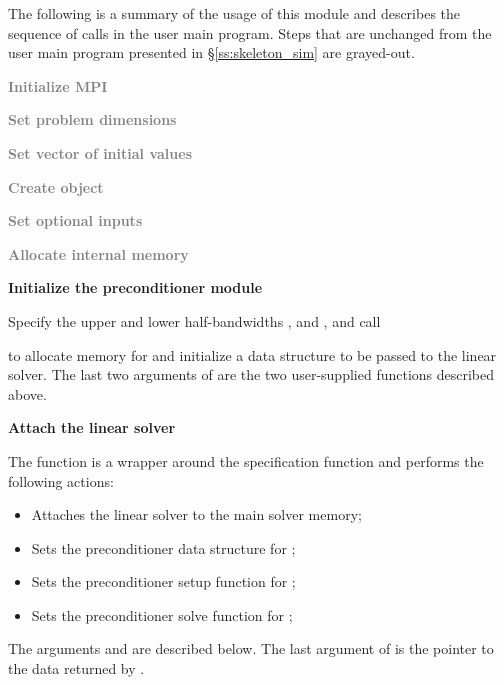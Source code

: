 The following is a summary of the usage of this module and describes the sequence
of calls in the user main program. Steps that are unchanged from the user main
program presented in \S\ref{ss:skeleton_sim} are grayed-out.
\begin{Steps}
\item 
  \textcolor{gray}{\bf Initialize MPI}

\item
  \textcolor{gray}{\bf Set problem dimensions}

\item
  \textcolor{gray}{\bf Set vector of initial values}
 
\item
  \textcolor{gray}{\bf Create {\cvode} object}

\item
  \textcolor{gray}{\bf Set optional inputs}

\item
  \textcolor{gray}{\bf Allocate internal memory}

\item \label{i:bbdpre_init}
  {\bf Initialize the {\cvbbdpre} preconditioner module}

  Specify the upper and lower half-bandwidths ,  and
  ,  and call 


  to allocate memory for and initialize a data structure  to be 
  passed to the {\cvspgmr} linear solver. The last two arguments of
   are the two user-supplied functions described above.

\item \label{i:bbdpre_attach}
  {\bf Attach the {\cvspgmr} linear solver}


  The function  is a wrapper around the {\cvspgmr} specification
  function  and performs the following actions:
  \begin{itemize}
    \item Attaches the {\cvspgmr} linear solver to the main {\cvode} solver memory;
    \item Sets the preconditioner data structure for {\cvbbdpre};
    \item Sets the preconditioner setup function for {\cvbbdpre};
    \item Sets the preconditioner solve function for {\cvbbdpre};
  \end{itemize}
  The arguments  and  are described below.
  The last argument of  is the pointer to the {\cvbbdpre} data
  returned by .


\end{Steps}
